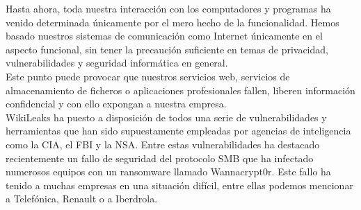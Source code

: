 Hasta ahora, toda nuestra interacción con los computadores y programas ha venido determinada únicamente por el mero hecho de la funcionalidad. Hemos basado nuestros sistemas de comunicación como Internet únicamente en el aspecto funcional, sin tener la precaución suficiente en temas de privacidad, vulnerabilidades y seguridad informática en general. \\
Este punto puede provocar que nuestros servicios web, servicios de almacenamiento de ficheros o aplicaciones profesionales fallen, liberen información confidencial y con ello expongan a nuestra empresa. \\
WikiLeaks ha puesto a disposición de todos una serie de vulnerabilidades y herramientas que han sido supuestamente empleadas por agencias de inteligencia como la CIA, el FBI y la NSA. Entre estas vulnerabilidades ha destacado recientemente un fallo de seguridad del protocolo SMB que ha infectado numerosos equipos con un ransomware llamado Wannacrypt0r. Este fallo ha tenido a muchas empresas en una situación difícil, entre ellas podemos mencionar a Telefónica, Renault o a Iberdrola.